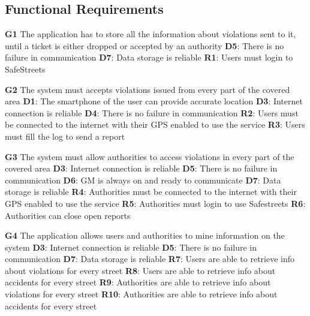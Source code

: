 \subsection{Functional Requirements}
\begin{outline}

    \1 \textbf{G1} The application has to store all the information about 
    violations sent to it, until a ticket is either dropped or accepted 
    by an authority
    \2 \textbf{D5}: There is no failure in communication
    \2 \textbf{D7}: Data storage is reliable
    \2 \textbf{R1}: Users must login to SafeStreets


    \1 \textbf{G2} The system must accepts violations issued from every 
    part of the covered area
    \2 \textbf{D1}: The smartphone of the user can provide accurate 
    location
    \2 \textbf{D3}: Internet connection is reliable
    \2 \textbf{D4}: There is no failure in communication
    \2 \textbf{R2}: Users must be connected to the internet with their 
    GPS enabled to use the service
    \2 \textbf{R3}: Users must fill the log to send a report

    
    \1 \textbf{G3} The system must allow authorities to access 
    violations in every part of the covered area
    \2 \textbf{D3}: Internet connection is reliable
    \2 \textbf{D5}: There is no failure in communication
    \2 \textbf{D6}: GM is always on and ready to communicate
    \2 \textbf{D7}: Data storage is reliable
    \2 \textbf{R4}: Authorities must be connected to the internet with 
    their GPS enabled to use the service
    \2 \textbf{R5}: Authorities must login to use Safestreets
    \2 \textbf{R6}: Authorities can close open reports 


    \1 \textbf{G4} The application allows users and authorities 
    to mine information on the system
    \2 \textbf{D3}: Internet connection is reliable
    \2 \textbf{D5}: There is no failure in communication
    \2 \textbf{D7}: Data storage is reliable
    \2 \textbf{R7}: Users are able to retrieve info about violations 
    for every street
    \2 \textbf{R8}: Users are able to retrieve info about accidents 
    for every street
    \2 \textbf{R9}: Authorities are able to retrieve info about violations 
    for every street
    \2 \textbf{R10}: Authorities are able to retrieve info about accidents 
    for every street


\end{outline}
